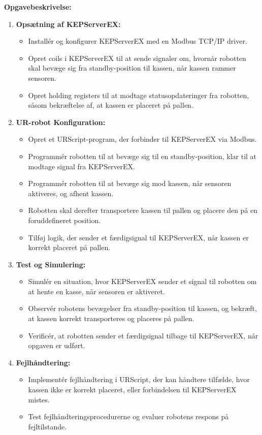 \textbf{Opgavebeskrivelse:}
\begin{enumerate}
	\item \textbf{Opsætning af KEPServerEX:}
	\begin{itemize}
		\item Installér og konfigurer KEPServerEX med en Modbus TCP/IP driver.
		\item Opret coils i KEPServerEX til at sende signaler om, hvornår robotten skal bevæge sig fra standby-position til kassen, når kassen rammer sensoren.
		\item Opret holding registers til at modtage statusopdateringer fra robotten, såsom bekræftelse af, at kassen er placeret på pallen.
	\end{itemize}
	
	\item \textbf{UR-robot Konfiguration:}
	\begin{itemize}
		\item Opret et URScript-program, der forbinder til KEPServerEX via Modbus.
		\item Programmér robotten til at bevæge sig til en standby-position, klar til at modtage signal fra KEPServerEX.
		\item Programmér robotten til at bevæge sig mod kassen, når sensoren aktiveres, og afhent kassen.
		\item Robotten skal derefter transportere kassen til pallen og placere den på en foruddefineret position.
		\item Tilføj logik, der sender et færdigsignal til KEPServerEX, når kassen er korrekt placeret på pallen.
	\end{itemize}
	
	\item \textbf{Test og Simulering:}
	\begin{itemize}
		\item Simulér en situation, hvor KEPServerEX sender et signal til robotten om at hente en kasse, når sensoren er aktiveret.
		\item Observér robotens bevægelser fra standby-position til kassen, og bekræft, at kassen korrekt transporteres og placeres på pallen.
		\item Verificér, at robotten sender et færdigsignal tilbage til KEPServerEX, når opgaven er udført.
	\end{itemize}
	
	\item \textbf{Fejlhåndtering:}
	\begin{itemize}
		\item Implementér fejlhåndtering i URScript, der kan håndtere tilfælde, hvor kassen ikke er korrekt placeret, eller forbindelsen til KEPServerEX mistes.
		\item Test fejlhåndteringsprocedurerne og evaluer robotens respons på fejltilstande.
	\end{itemize}
\end{enumerate}


